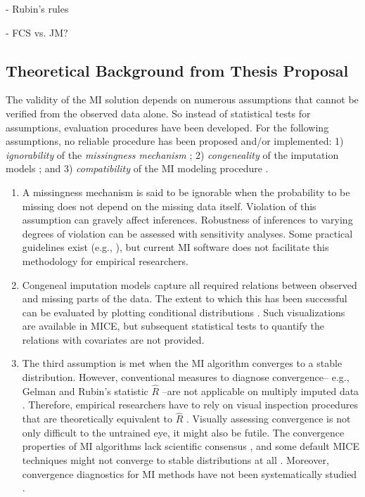 \documentclass[article]{jss}
\begin{document}
- Rubin's rules

- FCS vs. JM?

\subsection{Theoretical Background from Thesis Proposal}

The validity of the MI solution depends on numerous assumptions that cannot be verified from the observed data alone. So instead of statistical tests for assumptions, evaluation procedures have been developed. For the following assumptions, no reliable procedure has been proposed and/or implemented: 1) \emph{ignorability} of the \emph{missingness mechanism} \citep{rubin87}; 2) \emph{congeneality} of the imputation models \citep{meng94}; and 3) \emph{compatibility} of the MI modeling procedure \citep{rubin96}. 

\begin{enumerate}
\item A missingness mechanism is said to be ignorable when the probability to be missing does not depend on the missing data itself. Violation of this assumption can gravely affect inferences. Robustness of inferences to varying degrees of violation can be assessed with sensitivity analyses. Some practical guidelines exist (e.g., \citep{nguy17}), but current MI software does not facilitate this methodology for empirical researchers.  %
%
\item Congeneal imputation models capture all required relations between observed and missing parts of the data. The extent to which this has been successful can be evaluated by plotting conditional distributions \citep{abay08}. Such visualizations are available in MICE, but subsequent statistical tests to quantify the relations with covariates are not provided. 
%
\item The third assumption is met when the MI algorithm converges to a stable distribution. However, conventional measures to diagnose convergence-- e.g., Gelman and Rubin's \citeyear{gelm92} statistic $\widehat{R}$ --are not applicable on multiply imputed data \citep{lace07}. Therefore, empirical researchers have to rely on visual inspection procedures that are theoretically equivalent to $\widehat{R}$ \citep{whit11}. Visually assessing convergence is not only difficult to the untrained eye, it might also be futile. The convergence properties of MI algorithms lack scientific consensus \citep{taka17}, and some default MICE techniques might not converge to stable distributions at all \citep{murr18}. Moreover, convergence diagnostics for MI methods have not been systematically studied \citep{buur18}.
\end{enumerate}
\end{document}
